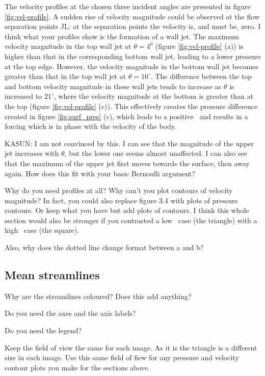 The velocity profiles at the chosen three incident angles are presented in figure \ref{fig:vel-profile}. A sudden rise of velocity magnitude could be observed at the flow separation points JL: at the separation points the velocity is, and must be, zero. I think what your profiles show is the formation of a wall jet. The maximum velocity magnitude in the top wall jet at $\theta= 4^{0}$ (figure \ref{fig:vel-profile} (a)) is higher than that in the corresponding bottom wall jet, leading to a lower pressure at the top edge. However, the velocity magnitude in the bottom wall jet becomes greater than that in the top wall jet at $\theta=16^{\circ}$. The difference between the top and bottom velocity magnitude in these wall jets tends to increase as $\theta$ is increased to $21^{\circ}$, where the velocity magnitude at the bottom is greater than at the top (figure \ref{fig:vel-profile} (c)). This effectively creates the pressure difference created in figure \ref{fig:surf_pres} (c), which leads to a positive \cy\ and results in a forcing which is in phase with the velocity of the body. 

KASUN: I am not convinced by this. I can see that the magnitude of the upper jet increases with $\theta$, but the lower one seems almost unaffected. I can also see that the maximum of the upper jet first moves towards the surface, then away again. How does this fit with your basic Bernoulli argument?

Why do you need profiles at all? Why can't you plot contours of velocity magnitude? In fact, you could also replace figure 3.4 with plots of pressure contours. Or keep what you have but add plots of contours. I think this whole section would also be stronger if you contrasted a low \ratio\ case (the triangle) with a high \ratio\ case (the square).

Also, why does the dotted line change format between a and b?


\subsection{Mean streamlines}



Why are the streamlines coloured? Does this add anything?

Do you need the axes and the axis labels?

Do you need the legend?

Keep the field of view the same for each image. As it is the triangle
is a different size in each image. Use this same field of fiew for any pressure and velocity contour plots you make for the sections above.

